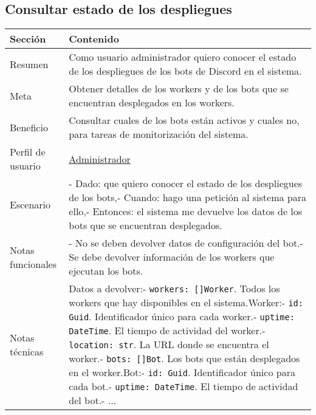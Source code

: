 \subsection{Consultar estado de los despliegues}

\begin{table}[H]
    \centering
    \def\arraystretch{1.25}
    \begin{adjustbox}{max width=\textwidth}
    \begin{tabularx}{\textwidth}{l|L}
    \hline
        \textbf{Sección} & \textbf{Contenido} \\ \hline
    \hline
        Resumen & Como usuario administrador quiero conocer el estado de los despliegues de los bots de Discord en el sistema. \\ \hline
        Meta & Obtener detalles de los workers y de los bots que se encuentran desplegados en los workers. \\ \hline
        Beneficio & Consultar cuales de los bots están activos y cuales no, para tareas de monitorización del sistema. \\ \hline
        Perfil de usuario & \hyperref[sec:personaAdmin]{Administrador} \\ \hline
        Escenario & - Dado: que quiero conocer el estado de los despliegues de los bots,\linebreak - Cuando: hago una petición al sistema para ello,\linebreak - Entonces: el sistema me devuelve los datos de los bots que se encuentran desplegados. \\ \hline
        Notas funcionales & - No se deben devolver datos de configuración del bot.\linebreak - Se debe devolver información de los workers que ejecutan los bots. \\ \hline
        Notas técnicas & Datos a devolver:\linebreak - \verb|workers: []Worker|. Todos los workers que hay disponibles en el sistema.\linebreak \linebreak Worker:\linebreak - \verb|id: Guid|. Identificador único para cada worker.\linebreak - \verb|uptime: DateTime|. El tiempo de actividad del worker.\linebreak - \verb|location: str|. La URL donde se encuentra el worker.\linebreak - \verb|bots: []Bot|. Los bots que están desplegados en el worker.\linebreak \linebreak Bot:\linebreak - \verb|id: Guid|. Identificador único para cada bot.\linebreak - \verb|uptime: DateTime|. El tiempo de actividad del bot.\linebreak - ... \\ \hline

\end{tabularx}
\end{adjustbox}
\end{table}
